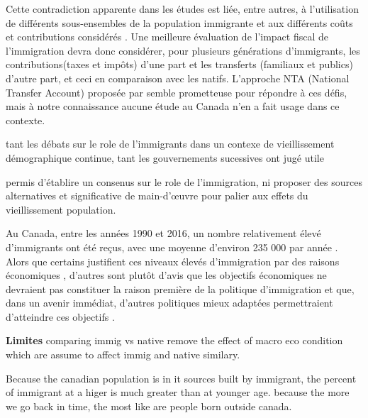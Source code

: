 Cette contradiction apparente dans les études est liée, entre autres, à l'utilisation de différents sous-ensembles de la population immigrante \citep{Grubel:2012wo} et aux différents coûts et contributions considérés \citep{dAlbis:2019de}. Une meilleure évaluation de l'impact fiscal de l'immigration devra donc considérer, pour plusieurs générations d'immigrants, les contributions(taxes et impôts) d'une part et les transferts (familiaux et publics) d'autre part, et ceci en comparaison avec les natifs. L'approche NTA (National Transfer Account) proposée par \citet{Mason:2011wc} semble prometteuse pour répondre à ces défis, mais à notre connaissance aucune étude au Canada n'en a fait usage dans ce contexte.

tant les débats sur le role de l'immigrants dans un contexe de vieillissement démographique continue, tant les gouvernements sucessives ont jugé utile




permis d'établire un consenus sur le role de l'immigration, ni proposer des sources alternatives et significative de main-d’œuvre pour palier aux effets du vieillissement population.



 Au Canada, entre  les années 1990 et 2016, un nombre relativement élevé d’immigrants ont été reçus, avec une moyenne d’environ 235 000 par année \citep{StatistiqueCanada:2016ud}. Alors que certains justifient ces niveaux élevés d’immigration par des raisons économiques \citep{Christine:2015tu,Newton:1981jy}, d’autres sont plutôt d’avis que les objectifs économiques ne devraient pas constituer la raison première de la politique d’immigration et que, dans un avenir immédiat, d’autres politiques mieux adaptées permettraient d’atteindre ces objectifs \citep{Gingras:2000dk,Green:1999ko,McDaniel:2013kf,Wong:2015uz}.



\textbf{Limites}
comparing immig vs native remove the effect of macro eco condition which are assume to affect immig and native similary.


Because the canadian population is in it sources built by immigrant, the percent of immigrant at a higer is much greater than at younger age. because the more we go back in time, the most like are people born outside canada.




